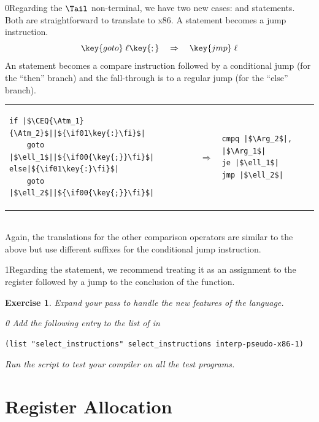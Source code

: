 \documentclass[7x10,nocrop]{TimesAPriori_MIT}%
\def\racketEd{0}
\def\pythonEd{1}
\def\edition{0}
\newcommand{\racket}[1]{{\if\edition\racketEd{#1}\fi}}
\newcommand{\python}[1]{{\if\edition\pythonEd #1\fi}}
\newtheorem{exercise}[theorem]{Exercise}
\begin{document}
\racket{Regarding the $\Tail$ non-terminal, we have two new cases:
  \key{goto} and \key{if} statements. Both are straightforward to
  translate to x86.}
%
A  statement becomes a jump instruction.
\[
\key{goto}\; \ell\racket{\key{;}} \quad \Rightarrow \quad \key{jmp}\;\ell
\]
%
An  statement becomes a compare instruction followed by a
conditional jump (for the ``then'' branch) and the fall-through is to
a regular jump (for the ``else'' branch).\\
\begin{tabular}{lll}
\begin{minipage}{0.4\textwidth}
\begin{lstlisting}
if |$\CEQ{\Atm_1}{\Atm_2}$||$\python{\key{:}}$|
    goto |$\ell_1$||$\racket{\key{;}}$|
else|$\python{\key{:}}$|
    goto |$\ell_2$||$\racket{\key{;}}$|
\end{lstlisting}
\end{minipage}
&
$\Rightarrow$
&
\begin{minipage}{0.4\textwidth}
\begin{lstlisting}
cmpq |$\Arg_2$|, |$\Arg_1$|
je |$\ell_1$|
jmp |$\ell_2$|
\end{lstlisting}
\end{minipage}
\end{tabular}  \\
Again, the translations for the other comparison operators are similar to the
above but use different suffixes for the conditional jump instruction.

\python{Regarding the  statement, we recommend treating it
  as an assignment to the \key{rax} register followed by a jump to the
  conclusion of the \code{main} function.}

\begin{exercise}\normalfont\normalsize
Expand your  pass to handle the new
features of the \LangIf{} language.
%
{\if\edition\racketEd
Add the following entry to the list of  in
\begin{lstlisting}
(list "select_instructions" select_instructions interp-pseudo-x86-1)
\end{lstlisting}
\fi}
%
Run the script to test your compiler on all the test programs.
\end{exercise}

\section{Register Allocation}
\label{sec:register-allocation-Lif}
\end{document}
